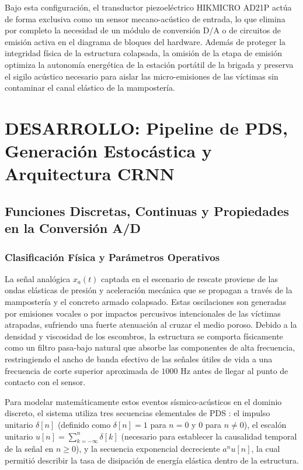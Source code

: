 \documentclass[11pt, a4paper]{article}
\begin{document}
Bajo esta configuración, el transductor piezoeléctrico HIKMICRO AD21P actúa de forma exclusiva como un sensor mecano-acústico de entrada, lo que elimina por completo la necesidad de un módulo de conversión D/A o de circuitos de emisión activa en el diagrama de bloques del hardware. Además de proteger la integridad física de la estructura colapsada, la omisión de la etapa de emisión optimiza la autonomía energética de la estación portátil de la brigada y preserva el sigilo acústico necesario para aislar las micro-emisiones de las víctimas sin contaminar el canal elástico de la mampostería.

\section{DESARROLLO: Pipeline de PDS, Generación Estocástica y Arquitectura CRNN}

\subsection{Funciones Discretas, Continuas y Propiedades en la Conversión A/D}

\subsubsection{Clasificación Física y Parámetros Operativos}
La señal analógica $x_a(t)$ captada en el escenario de rescate proviene de las ondas elásticas de presión y aceleración mecánica que se propagan a través de la mampostería y el concreto armado colapsado. Estas oscilaciones son generadas por emisiones vocales o por impactos percusivos intencionales de las víctimas atrapadas, sufriendo una fuerte atenuación al cruzar el medio poroso. Debido a la densidad y viscosidad de los escombros, la estructura se comporta físicamente como un filtro pasa-bajo natural que absorbe las componentes de alta frecuencia, restringiendo el ancho de banda efectivo de las señales útiles de vida a una frecuencia de corte superior aproximada de $1000\text{ Hz}$ antes de llegar al punto de contacto con el sensor.

Para modelar matemáticamente estos eventos sísmico-acústicos en el dominio discreto, el sistema utiliza tres secuencias elementales de PDS \cite{Oppenheim}: el impulso unitario $\delta[n]$ (definido como $\delta[n]=1$ para $n=0$ y $0$ para $n \neq 0$), el escalón unitario $u[n] = \sum_{k=-\infty}^{n} \delta[k]$ (necesario para establecer la causalidad temporal de la señal en $n \ge 0$), y la secuencia exponencial decreciente $a^n u[n]$, la cual permitió describir la tasa de disipación de energía elástica dentro de la estructura.
\end{document}
